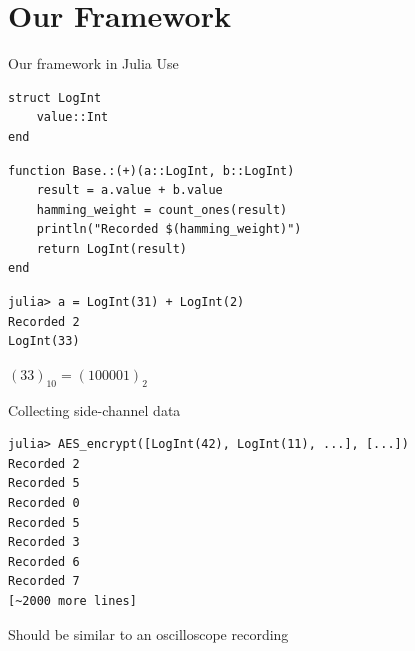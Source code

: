 
\section*{Our Framework}

\begin{frame}[fragile]{Our framework in Julia}
    Use  
    \vspace{1em}
    \begin{verbatim}
struct LogInt
    value::Int
end
    \end{verbatim}
    \pause
\begin{verbatim}
function Base.:(+)(a::LogInt, b::LogInt)
    result = a.value + b.value
    hamming_weight = count_ones(result)
    println("Recorded $(hamming_weight)")
    return LogInt(result)
end
\end{verbatim}
\vspace{1em}
\pause
\begin{verbatim}
julia> a = LogInt(31) + LogInt(2)
Recorded 2
LogInt(33)
\end{verbatim}
\vspace{-2em}
\hspace{10em}
{\scriptsize $(33)_{10} = (100001)_2$}
\end{frame}

\begin{frame}[fragile]{Collecting side-channel data}

    \begin{verbatim}
julia> AES_encrypt([LogInt(42), LogInt(11), ...], [...])
Recorded 2
Recorded 5
Recorded 0
Recorded 5
Recorded 3
Recorded 6
Recorded 7
[~2000 more lines]
        \end{verbatim}
\vspace{1em}
Should be similar to an oscilloscope recording
\end{frame}


